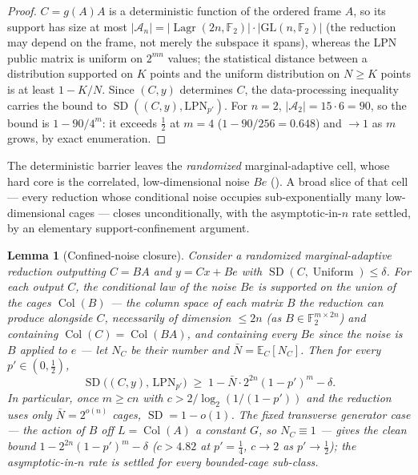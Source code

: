 \documentclass[11pt,a4paper]{article}
\theoremstyle{plain}
\newtheorem{lemma}[theorem]{Lemma}
\theoremstyle{definition}
\newcommand{\F}{\mathbb{F}}
\DeclareMathOperator{\Lagr}{Lagr}
\begin{document}
\begin{proof}
$C=g(A)A$ is a deterministic function of the ordered frame $A$, so its support has size at most $|\mathcal{A}_n|=|\Lagr(2n,\F_2)|\cdot|\mathrm{GL}(n,\F_2)|$ (the reduction may depend on the frame, not merely the subspace it spans), whereas the LPN public matrix is uniform on $2^{mn}$ values; the statistical distance between a distribution supported on $K$ points and the uniform distribution on $N\ge K$ points is at least $1-K/N$. Since $(C,y)$ determines $C$, the data-processing inequality carries the bound to $\operatorname{SD}((C,y),\mathrm{LPN}_{p'})$. For $n=2$, $|\mathcal{A}_2|=15\cdot 6=90$, so the bound is $1-90/4^m$: it exceeds $\tfrac12$ at $m=4$ ($1-90/256=0.648$) and $\to 1$ as $m$ grows, by exact enumeration.
\end{proof}

The deterministic barrier leaves the \emph{randomized} marginal-adaptive cell, whose hard core is the correlated, low-dimensional noise $Be$ (). A broad slice of that cell --- every reduction whose conditional noise occupies sub-exponentially many low-dimensional cages --- closes unconditionally, with the asymptotic-in-$n$ rate settled, by an elementary support-confinement argument.

\begin{lemma}[Confined-noise closure]
\label{lem:confined-g}
Consider a randomized marginal-adaptive reduction outputting $C=BA$ and $y=Cx+Be$ with $\operatorname{SD}(C,\operatorname{Uniform})\le\delta$. For each output $C$, the conditional law of the noise $Be$ is supported on the union of the \emph{cages} $\operatorname{Col}(B)$ --- the column space of each matrix $B$ the reduction can produce alongside $C$, necessarily of dimension $\le 2n$ (as $B\in\F_2^{m\times 2n}$) and containing $\operatorname{Col}(C)=\operatorname{Col}(BA)$, and containing every $Be$ since the noise is $B$ applied to $e$ --- let $N_C$ be their number and $\bar N=\mathbb{E}_C[N_C]$. Then for every $p'\in(0,\tfrac12)$,
\[
\operatorname{SD}\bigl((C,y),\,\mathrm{LPN}_{p'}\bigr)\;\ge\;1-\bar N\cdot 2^{2n}(1-p')^{m}-\delta .
\]
In particular, once $m\ge cn$ with $c>2/\log_2(1/(1-p'))$ and the reduction uses only $\bar N=2^{o(n)}$ cages, $\operatorname{SD}=1-o(1)$. The \emph{fixed transverse generator} case --- the action of $B$ off $L=\operatorname{Col}(A)$ a constant $G$, so $N_C\equiv 1$ --- gives the clean bound $1-2^{2n}(1-p')^m-\delta$ ($c>4.82$ at $p'=\tfrac14$, $c\to2$ as $p'\to\tfrac12$); the asymptotic-in-$n$ rate is settled for every bounded-cage sub-class.
\end{lemma}
\end{document}
